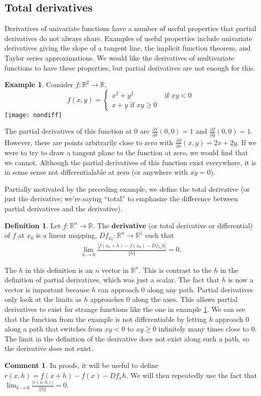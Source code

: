 \documentclass[12pt,reqno]{amsart}
\theoremstyle{definition}
\newtheorem{definition}{Definition}[section]
\newtheorem{remark}{Comment}[section]
\newtheorem{example}{Example}[section]
\def\R{\mathbb{R}}
\newcommand{\norm}[1]{\left\Vert {#1} \right\Vert}
\renewcommand{\to}{{\rightarrow}}
\begin{document}
\subsection{Total derivatives}

Derivatives of univariate functions have a number of useful properties
that partial derivatives do not always share. Examples of useful
properties include univariate derivatives giving the slope of a
tangent line, the implicit function theorem, and Taylor series
approximations. We would like the derivatives of multivariate
functions to have these properties, but partial derivatives are not
enough for this.

\begin{example}\label{ex:nondiff}
  Consider $f:\R^2 \to \R$, 
  \[ f(x,y) = \begin{cases} x^2+y^2 & \text{ if } xy < 0 \\
    x + y \text{ if } xy \geq 0 
  \end{cases}
  \]
  \texttt{[image: nondiff]}
  
  The partial derivatives of this function at $0$ are $\frac{\partial
    f}{\partial x}(0,0) = 1$ and $\frac{\partial f}{\partial y}(0,0) =
  1$. However, there are points arbitrarily close to zero with
  $\frac{\partial f}{\partial x}(x,y) = 2x + 2y$. If we were to try to
  draw a tangent plane to the function at zero, we would find that we
  cannot. Although the partial derivatives of this function exist
  everywhere, it is in some sense not differentialable at zero (or
  anywhere with $xy = 0$).
\end{example}
Partially motivated by the preceding example, we define the
total derivative (or just the derivative; we're saying ``total'' to
emphasize the difference between partial derivatives and the derivative).
\begin{definition}
  Let $f: \R^n \to \R$. The \textbf{derivative} (or total derivative
  or differential) of $f$ at $x_0$ is a  linear mapping, $Df_{x_0}:
  \R^n \to \R^1$ such that
  \begin{align*}
    \lim_{h \to 0} \frac{\left|f(x_0 + h) - f(x_0) - Df_{x_0} h\right|} {\norm{h}}
    = 0.
  \end{align*}
\end{definition}
The $h$ in this definition is an $n$ vector in $\R^n$. This is
contrast to the $h$ in the definition of partial derivatives, which
was just a scalar. The fact that $h$ is now a vector is important
because $h$ can approach $0$ along any path. Partial derivatives only
look at the limits as $h$ approaches $0$ along the axes. This allows
partial derivatives to exist for strange functions like the one in
example \ref{ex:nondiff}. We can see that the function from the
example is not differentiable by letting $h$ approach $0$ along a path
that switches from $xy<0$ to $xy\geq 0$ infinitely many times close to
$0$. The limit in the definition of the derivative does not exist
along such a path, so the derivative does not exist. 
\begin{remark}
  In proofs, it will be useful to define $r(x,h) = f(x+h) - f(x) -
  Df_x h$. We will then repeatedly use the fact that $\lim_{h \to 0}
  \frac{|r(x,h)|}{\norm{h}} = 0$.
\end{remark}
\end{document}
